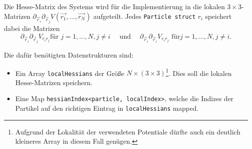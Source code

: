 \documentclass{scrartcl}
\begin{document}
Die Hesse-Matrix des Systems wird für die Implementierung in die
lokalen \(3\times 3\)-Matrizen
\(\partial_{\vec{r}_i}\partial_{\vec{r}_j} V(\vec{r_1}, \dots,
\vec{r_N})\) aufgeteilt.
Jedes \texttt{Particle struct} \(r_i\) speichert dabei die Matrizen
\[
\partial_{\vec{r}_i} \partial_{\vec{r}_j} V_{r_i r_j} \text{für } j=1,
\dots, N, j\neq i \quad \text{ und }
\quad \partial_{\vec{r}_i} \partial_{\vec{r}_i} V_{r_i r_j} \text{ für
} j = 1, \dots, N, j\neq i.
\]

Die dafür benötigten Datenstrukturen sind:
\begin{itemize}
\item Ein Array \texttt{localHessians} der Größe \(N\times (3\times
  3)\)\footnote{Aufgrund der Lokalität der verwendeten Potentiale
    dürfte auch ein deutlich kleineres Array in diesem Fall genügen.}. Dies soll die lokalen Hesse-Matrizen speichern.
\item Eine Map \texttt{hessianIndex<particle, localIndex>}, welche die
  Indizes der Partikel auf den richtigen Eintrag in
  \texttt{localHessians} mapped.
\end{itemize}
\end{document}
